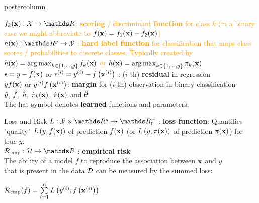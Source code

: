 \documentclass{beamer}
\begin{document}
\begin{frame}[fragile]{}
\begin{columns}
\begin{column}{.31\textwidth}
\begin{beamercolorbox}[center]{postercolumn}
\begin{minipage}{.98\textwidth}
{\begin{myblock}{}
\textcolor{orange}{
$\fkx: \Xspace \rightarrow \R$: \textbf{scoring} / discriminant \textbf{function} for class $k$ (in a binary case we might abbreviate to $f(\mathbf{x}) = f_{1}(\mathbf{x}) - f_{2}(\mathbf{x})$)}\\
 
\textcolor{orange}{
$\hx: \R^g \rightarrow \Yspace$ : \textbf{hard label function} for classification that maps class scores / probabilities to discrete classes. Typically created by $h(\mathbf{x}) = \operatorname{arg\,max}_{k \in \{1, \ldots, g\}} f_{k}(\mathbf{x})$ or $h(\mathbf{x}) = \operatorname{arg\,max}_{k \in \{1, \ldots, g\}} \pi_{k}(\mathbf{x})$}  \\



$\epsilon = y - f(\mathbf{x})$ or $\epsilon^{(i)} = y^{(i)} - f\left(\mathbf{x}^{(i)}\right)$ : ($i$-th) \textbf{residual} in regression\\

$y f(\mathbf{x})$ or $y^{(i)} f\left(\mathbf{x}^{(i)}\right)$: \textbf{margin} for ($i$-th) observation in binary classification\\%

$\hat{y}$, $\hat{f}$, $\hat{h}$, $\hat \pi_{k}(\mathbf{x})$, $\hat \pi(\mathbf{x})$ and $\hat{\theta}$ \\
The hat symbol denotes \textbf{learned} functions and parameters.
\end{myblock}
\begin{myblock}{Loss and Risk}
  $L: \Yspace \times \R^g \to \R^+_0$ : \textbf{loss function}: 
 Quantifies "quality" $L\left(y, f(\mathbf{x})\right)$ of prediction $f(\mathbf{x})$ (or $L\left(y, \pi(\mathbf{x})\right)$ of prediction $\pi(\mathbf{x})$) for true $y$. \\
  
  $\riske:  \Hspace \to \R $ : \textbf{empirical risk } \\
The ability of a model $f$ to reproduce the association between $\mathbf{x}$ and $y$ \\
that is present in the data $\mathcal{D}$ can be measured by the summed loss:
  
\begin{center}
  $\mathcal{R}_{\text{emp}}(f) = \sum\limits_{i=1}^n L\left(y^{(i)}, f\left(\mathbf{x}^{(i)}\right)\right)$ 
\end{center}  


\end{myblock}}
\end{minipage}
\end{beamercolorbox}
\end{column}
\end{columns}
\end{frame}
\end{document}
